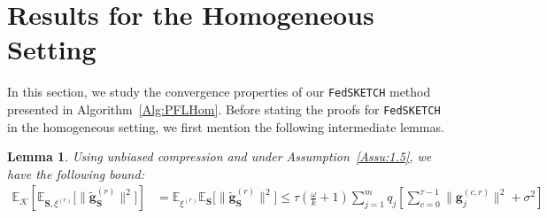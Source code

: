 \documentclass[twoside]{article}
\newtheorem{lemma}{Lemma}
\begin{document}
\section{Results for the Homogeneous Setting}
\label{sec:app:sgd:undrr-pl}



In this section, we study the convergence properties of our  \texttt{FedSKETCH} method presented in Algorithm~\ref{Alg:PFLHom}. Before stating the proofs for \texttt{FedSKETCH} in the homogeneous setting, we first mention the following intermediate lemmas. 



\begin{lemma}\label{lemma:tasbih1-iid}
Using unbiased compression and under Assumption~\ref{Assu:1.5}, we have the following bound: 
\begin{align}
\mathbb{E}_{\mathcal{K}}\left[\mathbb{E}_{{\mathbf{S},\xi^{(r)}}}\Big[\|\tilde{\mathbf{g}}_{\mathbf{S}}^{(r)}\|^2\Big]\right]&=\mathbb{E}_{{\xi}^{(r)}}\mathbb{E}_{\mathbf{S}}\Big[\|\tilde{\mathbf{g}}_\mathbf{S}^{(r)}\|^2\Big]\leq \tau(\frac{\omega}{k}+1)\sum_{j=1}^mq_j\left[\sum_{c=0}^{\tau-1}\|\mathbf{g}_j^{(c,r)}\|^2+\sigma^2\right] \label{eq:lemma1}
\end{align}
\end{lemma}
\end{document}
